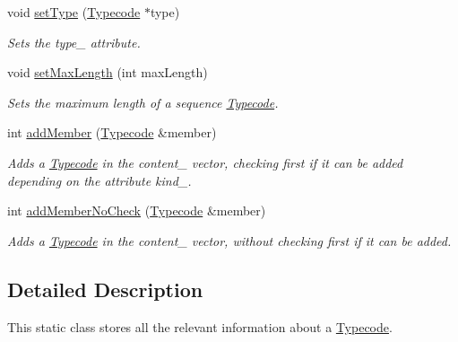 \begin{DoxyCompactItemize}
void \hyperlink{class_dynamic_fast_buffers_1_1_typecode_aba0c4f4c3fbab3d4e9f996af1f6f3e7e}{set\-Type} (\hyperlink{class_dynamic_fast_buffers_1_1_typecode}{Typecode} $\ast$type)
\begin{DoxyCompactList}\small\item\em Sets the type\-\_\- attribute. \end{DoxyCompactList}\item 
void \hyperlink{class_dynamic_fast_buffers_1_1_typecode_a7b35e52d7aed7435f75a751b419d63c3}{set\-Max\-Length} (int max\-Length)
\begin{DoxyCompactList}\small\item\em Sets the maximum length of a sequence \hyperlink{class_dynamic_fast_buffers_1_1_typecode}{Typecode}. \end{DoxyCompactList}\item 
int \hyperlink{class_dynamic_fast_buffers_1_1_typecode_aa5a604000c31333290023ee7c0099f04}{add\-Member} (\hyperlink{class_dynamic_fast_buffers_1_1_typecode}{Typecode} \&member)
\begin{DoxyCompactList}\small\item\em Adds a \hyperlink{class_dynamic_fast_buffers_1_1_typecode}{Typecode} in the content\-\_\- vector, checking first if it can be added depending on the attribute kind\-\_\-. \end{DoxyCompactList}\item 
int \hyperlink{class_dynamic_fast_buffers_1_1_typecode_a12c7577a56a04aab3b8d53ed9622d34c}{add\-Member\-No\-Check} (\hyperlink{class_dynamic_fast_buffers_1_1_typecode}{Typecode} \&member)
\begin{DoxyCompactList}\small\item\em Adds a \hyperlink{class_dynamic_fast_buffers_1_1_typecode}{Typecode} in the content\-\_\- vector, without checking first if it can be added. \end{DoxyCompactList}\end{DoxyCompactItemize}


\subsection{Detailed Description}
This static class stores all the relevant information about a \hyperlink{class_dynamic_fast_buffers_1_1_typecode}{Typecode}. 

